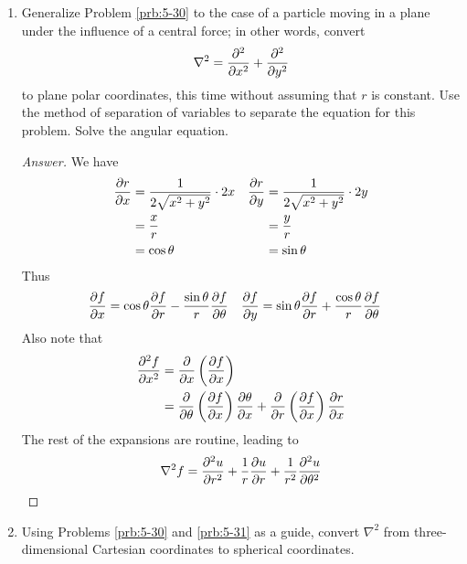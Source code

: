 \documentclass[../notes.tex]{subfiles}
\begin{document}
\begin{enumerate}[label={\textbf{5-\arabic*.}},ref={5-\arabic*}]
\begin{proof}[Answer]
        \begin{align*}
            \hat{H}\psi(\theta) &= E\psi(\theta)\\
            \left( -\frac{\hbar^2}{2m}\nabla^2 \right)\psi(\theta) &= E\psi(\theta)\\
            -\frac{\hbar^2}{2m}\cdot\frac{1}{r^2}\left( \pdv[2]{\psi(\theta)}{\theta} \right)_r &= E\psi(\theta)\\
            -\frac{\hbar^2}{2I}\pdv[2]{\psi(\theta)}{\theta} &= E\psi(\theta)
        \end{align*}
        as desired.
    \end{proof}
    \item \label{prb:5-31}Generalize Problem \ref{prb:5-30} to the case of a particle moving in a plane under the influence of a central force; in other words, convert
    \begin{equation*}
        \nabla^2 = \pdv[2]{x}+\pdv[2]{y}
    \end{equation*}
    to plane polar coordinates, this time without assuming that $r$ is constant. Use the method of separation of variables to separate the equation for this problem. Solve the angular equation.
    \begin{proof}[Answer]
        We have
        \begin{align*}
            \pdv{r}{x} &= \frac{1}{2\sqrt{x^2+y^2}}\cdot 2x&
                \pdv{r}{y} &= \frac{1}{2\sqrt{x^2+y^2}}\cdot 2y\\
            &= \frac{x}{r}&
                &= \frac{y}{r}\\
            &= \cos\theta&
                &= \sin\theta
        \end{align*}
        Thus
        \begin{align*}
            \pdv{f}{x} &= \cos\theta\pdv{f}{r}-\frac{\sin\theta}{r}\pdv{f}{\theta}&
            \pdv{f}{y} &= \sin\theta\pdv{f}{r}+\frac{\cos\theta}{r}\pdv{f}{\theta}
        \end{align*}
        Also note that
        \begin{align*}
            \pdv[2]{f}{x} &= \pdv{x}\left( \pdv{f}{x} \right)\\
            &= \pdv{\theta}\left( \pdv{f}{x} \right)\pdv{\theta}{x}+\pdv{r}\left( \pdv{f}{x} \right)\pdv{r}{x}
        \end{align*}
        The rest of the expansions are routine, leading to
        \begin{equation*}
            \nabla^2f = \pdv[2]{u}{r}+\frac{1}{r}\pdv{u}{r}+\frac{1}{r^2}\pdv[2]{u}{\theta}
        \end{equation*}
    \end{proof}
    \item \label{prb:5-32}Using Problems \ref{prb:5-30} and \ref{prb:5-31} as a guide, convert $\nabla^2$ from three-dimensional Cartesian coordinates to spherical coordinates.
\end{enumerate}
\end{document}
